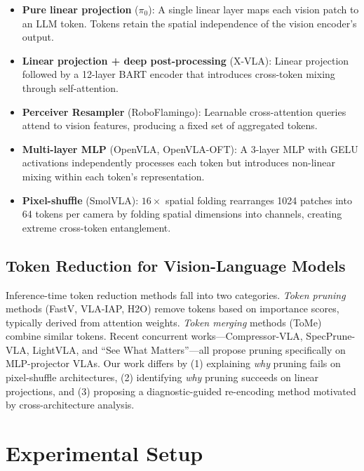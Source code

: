 \documentclass[letterpaper]{article}
\begin{document}
\begin{itemize}
    \item \textbf{Pure linear projection} ($\pi_0$): A single linear layer maps each vision patch to an LLM token. Tokens retain the spatial independence of the vision encoder's output.
    \item \textbf{Linear projection + deep post-processing} (X-VLA): Linear projection followed by a 12-layer BART encoder that introduces cross-token mixing through self-attention.
    \item \textbf{Perceiver Resampler} (RoboFlamingo): Learnable cross-attention queries attend to vision features, producing a fixed set of aggregated tokens.
    \item \textbf{Multi-layer MLP} (OpenVLA, OpenVLA-OFT): A 3-layer MLP with GELU activations independently processes each token but introduces non-linear mixing within each token's representation.
    \item \textbf{Pixel-shuffle} (SmolVLA): $16\times$ spatial folding rearranges 1024 patches into 64 tokens per camera by folding spatial dimensions into channels, creating extreme cross-token entanglement.
\end{itemize}

\subsection{Token Reduction for Vision-Language Models}

Inference-time token reduction methods fall into two categories. \emph{Token pruning} methods (FastV, VLA-IAP, H2O) remove tokens based on importance scores, typically derived from attention weights. \emph{Token merging} methods (ToMe) combine similar tokens. Recent concurrent works---Compressor-VLA, SpecPrune-VLA, LightVLA, and ``See What Matters''---all propose pruning specifically on MLP-projector VLAs. Our work differs by (1) explaining \emph{why} pruning fails on pixel-shuffle architectures, (2) identifying \emph{why} pruning succeeds on linear projections, and (3) proposing a diagnostic-guided re-encoding method motivated by cross-architecture analysis.

\section{Experimental Setup}
\end{document}
